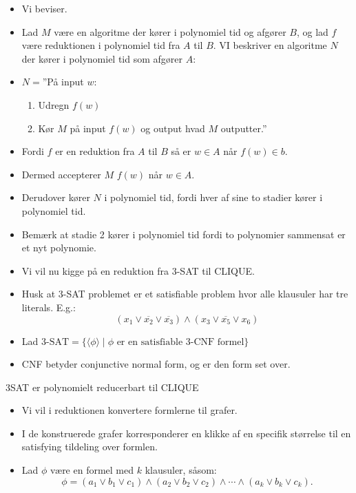 \begin{frame}[allowframebreaks]
	\begin{itemize}
		\item Vi beviser.
		\item Lad $M$ være en algoritme der kører i polynomiel tid og afgører $B$, og lad $f$ være reduktionen i polynomiel tid fra $A$ til $B$. VI beskriver en algoritme $N$ der kører i polynomiel tid som afgører $A$:
		\item $N =$''På input $w$:
		      \begin{enumerate}
			      \item Udregn $f(w)$
			      \item Kør $M$ på input $f(w)$ og output hvad $M$ outputter.''
		      \end{enumerate}
		\item Fordi $f$ er en reduktion fra $A$ til $B$ så er $w \in A$ når $f(w) \in b$.
		\item Dermed accepterer $M$ $f(w)$ når $w \in A$.
		\item Derudover kører $N$ i polynomiel tid, fordi hver af sine to stadier kører i polynomiel tid.
		\item Bemærk at stadie 2 kører i polynomiel tid fordi to polynomier sammensat er et nyt polynomie.
		\item Vi vil nu kigge på en reduktion fra $3$-SAT til CLIQUE.
		\item Husk at $3$-SAT problemet er et satisfiable problem hvor alle klausuler har tre literals. E.g.:
		      \begin{equation}
			      (x_{1} \lor \overline{x_{2}} \lor \overline{x_{3}}) \land (x_{3} \lor \overline{x_{5}} \lor x_{6})
		      \end{equation}
		\item Lad $\text{3-SAT} = \{\langle \phi  \rangle \mid \phi \text{ er en satisfiable 3-CNF formel}\}$
		\item CNF betyder conjunctive normal form, og er den form set over.
	\end{itemize}

	\begin{theorem}
		3SAT er polynomielt reducerbart til CLIQUE
	\end{theorem}

	\begin{itemize}
		\item Vi vil i reduktionen konvertere formlerne til grafer.
		\item I de konstruerede grafer korresponderer en klikke af en specifik størrelse til en satisfying tildeling over formlen.
		\item Lad $\phi$ være en formel med $k$ klausuler, såsom:
		      \begin{equation}
			      \phi = (a_1 \lor b_1 \lor c_1) \land (a_2 \lor b_2 \lor c_2) \land \cdots \land (a_k \lor b_k \lor c_k).
		      \end{equation}


\end{itemize}
\end{frame}
